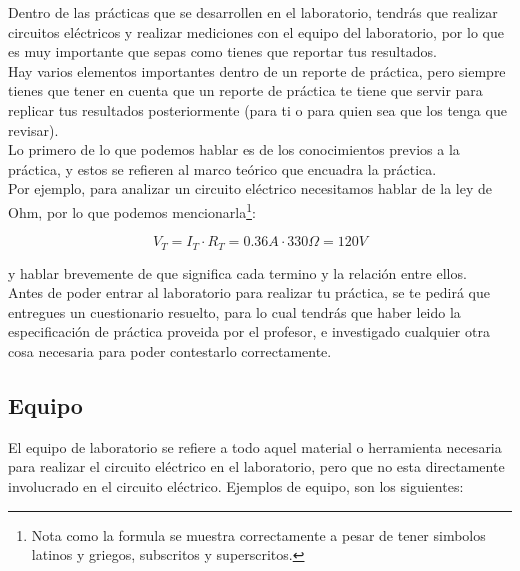 
		Dentro de las prácticas que se desarrollen en el laboratorio, tendrás que realizar circuitos eléctricos y realizar mediciones con el equipo del laboratorio, por lo que es muy importante que sepas como tienes que reportar tus resultados. \\

		Hay varios elementos importantes dentro de un reporte de práctica, pero siempre tienes que tener en cuenta que un reporte de práctica te tiene que servir para replicar tus resultados posteriormente (para ti o para quien sea que los tenga que revisar). \\

		Lo primero de lo que podemos hablar es de los conocimientos previos a la práctica, y estos se refieren al marco teórico que encuadra la práctica. \\

		Por ejemplo, para analizar un circuito eléctrico necesitamos hablar de la ley de Ohm, por lo que podemos mencionarla\footnote{Nota como la formula se muestra correctamente a pesar de tener simbolos latinos y griegos, subscritos y superscritos.}:

		\begin{equation}
			V_T = I_T \cdot R_T = 0.36 A \cdot 330 \Omega = 120 V
		\end{equation}

		y hablar brevemente de que significa cada termino y la relación entre ellos. \\

		Antes de poder entrar al laboratorio para realizar tu práctica, se te pedirá que entregues un cuestionario resuelto, para lo cual tendrás que haber leido la especificación de práctica proveida por el profesor, e investigado cualquier otra cosa necesaria para poder contestarlo correctamente. \\


\subsection{Equipo}

	El equipo de laboratorio se refiere a todo aquel material o herramienta necesaria para realizar el circuito eléctrico en el laboratorio, pero que no esta directamente involucrado en el circuito eléctrico. Ejemplos de equipo, son los siguientes:


